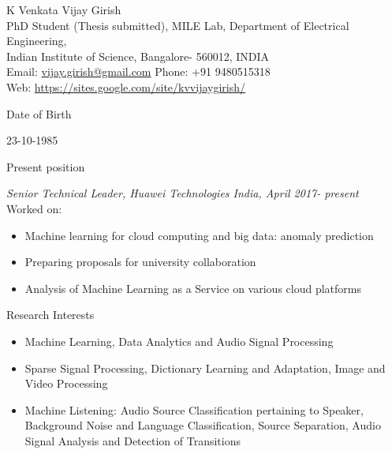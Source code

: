 \documentclass[10pt]{article}
\begin{document}
\newlength{\oldcvlabelwidth}
\newlength{\oldcvlabelsep}

\begin{cv}{{\large K Venkata Vijay Girish}\\
{ \normalsize  PhD Student (Thesis submitted), MILE Lab, Department of Electrical Engineering, \\Indian Institute of Science, Bangalore- 560012, INDIA
\\
Email: {\mdseries \href{mailto:vijay.girish@gmail.com}
	{vijay.girish@gmail.com}}
\hfill Phone: {\mdseries +91 9480515318} \hfill \\
Web: {\mdseries \href{https://sites.google.com/site/kvvijaygirish/}
	{https://sites.google.com/site/kvvijaygirish/}}}
}

\setlength{\oldcvlabelwidth}{\cvlabelwidth}
\setlength{\oldcvlabelsep}{\cvlabelsep}

\setlength{\cvlabelwidth}{1em}


\setlength{\cvlabelwidth}{0em}
\setlength{\cvlabelsep}{\labelsep}
\begin{cvlist}{Date of Birth}\item
23-10-1985
\end{cvlist}

\begin{cvlist}{Present position}\item
\emph{Senior Technical Leader, Huawei Technologies India, April 2017- present}\\
Worked on:
\begin{itemize}
\item Machine learning for cloud computing and big data: anomaly prediction
\item Preparing proposals for university collaboration
\item Analysis of Machine Learning as a Service on various cloud platforms

\end{itemize}
\end{cvlist}
\begin{cvlist}{Research Interests}\item
\begin{itemize}\itemsep=0.25em
 \item Machine Learning, Data Analytics and Audio Signal Processing
 
% 
\item Sparse Signal Processing, Dictionary Learning and Adaptation, Image and Video  Processing
\item Machine Listening: Audio Source Classification pertaining to Speaker, Background Noise and Language Classification, Source Separation, Audio Signal Analysis and Detection of Transitions


\end{itemize}
\end{cvlist}
\end{cv}
\end{document}
